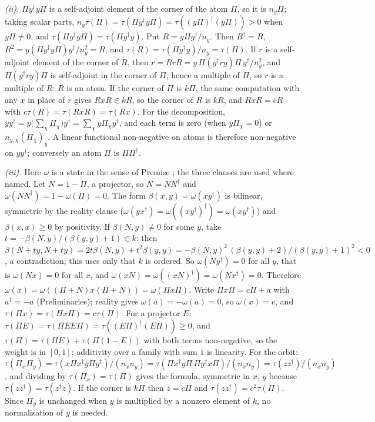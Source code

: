 \emph{(ii).} $\Pi y^{\dagger}y\Pi$ is a self-adjoint element of the corner of the atom $\Pi$, so it is $n_{y}\Pi$; taking scalar parts, $n_{y}\tau(\Pi) = \tau(\Pi y^{\dagger}y\Pi) = \tau((y\Pi)^{\dagger}(y\Pi)) > 0$ when $y\Pi \ne 0$, and $\tau(\Pi y^{\dagger}y\Pi) = \tau(\Pi y^{\dagger}y)$. Put $R = y\Pi y^{\dagger}/n_{y}$. Then $R^{\dagger} = R$, $R^{2} = y(\Pi y^{\dagger}y\Pi)y^{\dagger}/n_{y}^{2} = R$, and $\tau(R) = \tau(\Pi y^{\dagger}y)/n_{y} = \tau(\Pi)$. If $r$ is a self-adjoint element of the corner of $R$, then $r = RrR = y\,\Pi(y^{\dagger}ry)\Pi\,y^{\dagger}/n_{y}^{2}$, and $\Pi(y^{\dagger}ry)\Pi$ is self-adjoint in the corner of $\Pi$, hence a multiple of $\Pi$, so $r$ is a multiple of $R$: $R$ is an atom. If the corner of $\Pi$ is $k\Pi$, the same computation with any $x$ in place of $r$ gives $RxR \in kR$, so the corner of $R$ is $kR$, and $RxR = cR$ with $c\tau(R) = \tau(RxR) = \tau(Rx)$. For the decomposition, $yy^{\dagger} = y\bigl(\sum_{\chi}\Pi_{\chi}\bigr)y^{\dagger} = \sum_{\chi}y\Pi_{\chi}y^{\dagger}$, and each term is zero (when $y\Pi_{\chi} = 0$) or $n_{y,\chi}(\Pi_{\chi})_{y}$. A linear functional non-negative on atoms is therefore non-negative on $yy^{\dagger}$; conversely an atom $\Pi$ is $\Pi\Pi^{\dagger}$.

\emph{(iii).} Here $\omega$ is a state in the sense of Premise ; the three clauses are used where named. Let $N = 1 - \Pi$, a projector, so $N = NN^{\dagger}$ and $\omega(NN^{\dagger}) = 1 - \omega(\Pi) = 0$. The form $\beta(x,y) = \omega(xy^{\dagger})$ is bilinear, symmetric by the reality clause ($\omega(yx^{\dagger}) = \omega((xy^{\dagger})^{\dagger}) = \omega(xy^{\dagger})$) and $\beta(x,x) \ge 0$ by positivity. If $\beta(N,y) \ne 0$ for some $y$, take $t = -\beta(N,y)/(\beta(y,y) + 1) \in k$: then $\beta(N + ty, N + ty) = 2t\beta(N,y) + t^{2}\beta(y,y) = -\beta(N,y)^{2}\,(\beta(y,y) + 2)/(\beta(y,y) + 1)^{2} < 0$, a contradiction; this uses only that $k$ is ordered. So $\omega(Ny^{\dagger}) = 0$ for all $y$, that is $\omega(Nx) = 0$ for all $x$, and $\omega(xN) = \omega((xN)^{\dagger}) = \omega(Nx^{\dagger}) = 0$. Therefore $\omega(x) = \omega((\Pi + N)x(\Pi + N)) = \omega(\Pi x\Pi)$. Write $\Pi x\Pi = c\Pi + a$ with $a^{\dagger} = -a$ (Preliminaries); reality gives $\omega(a) = -\omega(a) = 0$, so $\omega(x) = c$, and $\tau(\Pi x) = \tau(\Pi x\Pi) = c\tau(\Pi)$. For a projector $E$: $\tau(\Pi E) = \tau(\Pi EE\Pi) = \tau((E\Pi)^{\dagger}(E\Pi)) \ge 0$, and $\tau(\Pi) = \tau(\Pi E) + \tau(\Pi(1 - E))$ with both terms non-negative, so the weight is in $[0,1]$; additivity over a family with sum $1$ is linearity. For the orbit: $\tau(\Pi_{x}\Pi_{y}) = \tau(x\Pi x^{\dagger}y\Pi y^{\dagger})/(n_{x}n_{y}) = \tau(\Pi x^{\dagger}y\Pi\,\Pi y^{\dagger}x\Pi)/(n_{x}n_{y}) = \tau(zz^{\dagger})/(n_{x}n_{y})$, and dividing by $\tau(\Pi_{x}) = \tau(\Pi)$ gives the formula, symmetric in $x$, $y$ because $\tau(zz^{\dagger}) = \tau(z^{\dagger}z)$. If the corner is $k\Pi$ then $z = c\Pi$ and $\tau(zz^{\dagger}) = c^{2}\tau(\Pi)$. Since $\Pi_{y}$ is unchanged when $y$ is multiplied by a nonzero element of $k$, no normalisation of $y$ is needed.

